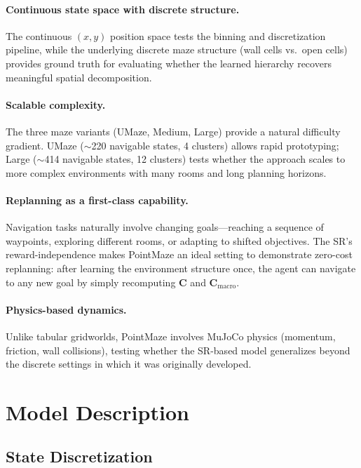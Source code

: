 \documentclass[11pt,a4paper]{article}
\newcommand{\C}{\mathbf{C}}
\newcommand{\Cmacro}{\C_{\text{macro}}}
\begin{document}
\paragraph{Continuous state space with discrete structure.}
The continuous $(x, y)$ position space tests the binning and discretization pipeline, while the underlying discrete maze structure (wall cells vs.\ open cells) provides ground truth for evaluating whether the learned hierarchy recovers meaningful spatial decomposition.

\paragraph{Scalable complexity.}
The three maze variants (UMaze, Medium, Large) provide a natural difficulty gradient.
UMaze ($\sim$220 navigable states, 4 clusters) allows rapid prototyping; Large ($\sim$414 navigable states, 12 clusters) tests whether the approach scales to more complex environments with many rooms and long planning horizons.

\paragraph{Replanning as a first-class capability.}
Navigation tasks naturally involve changing goals---reaching a sequence of waypoints, exploring different rooms, or adapting to shifted objectives.
The SR's reward-independence makes PointMaze an ideal setting to demonstrate zero-cost replanning: after learning the environment structure once, the agent can navigate to any new goal by simply recomputing $\C$ and $\Cmacro$.

\paragraph{Physics-based dynamics.}
Unlike tabular gridworlds, PointMaze involves MuJoCo physics (momentum, friction, wall collisions), testing whether the SR-based model generalizes beyond the discrete settings in which it was originally developed.

\section{Model Description}
\label{sec:model}

\subsection{State Discretization}
\label{sec:discretization}
\end{document}
